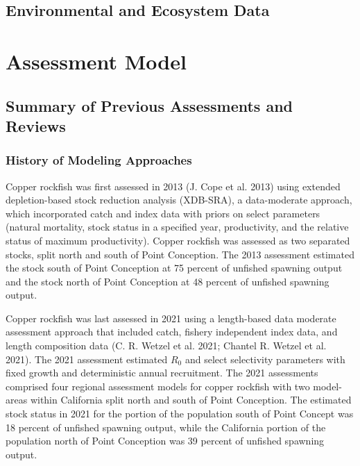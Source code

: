 \documentclass[11pt,
  english,
  letterpaper,
]{article}
\begin{document}
\hypertarget{environmental-and-ecosystem-data}{%
\subsection{Environmental and Ecosystem Data}\label{environmental-and-ecosystem-data}}

\hypertarget{assessment-model}{%
\section{Assessment Model}\label{assessment-model}}

\hypertarget{summary-of-previous-assessments-and-reviews}{%
\subsection{Summary of Previous Assessments and Reviews}\label{summary-of-previous-assessments-and-reviews}}

\hypertarget{history-of-modeling-approaches}{%
\subsubsection{History of Modeling Approaches}\label{history-of-modeling-approaches}}

Copper rockfish was first assessed in 2013 (J. Cope et al. 2013) using extended depletion-based stock reduction analysis (XDB-SRA), a data-moderate approach, which incorporated catch and index data with priors on select parameters (natural mortality, stock status in a specified year, productivity, and the relative status of maximum productivity). Copper rockfish was assessed as two separated stocks, split north and south of Point Conception. The 2013 assessment estimated the stock south of Point Conception at 75 percent of unfished spawning output and the stock north of Point Conception at 48 percent of unfished spawning output.

Copper rockfish was last assessed in 2021 using a length-based data moderate assessment approach that included catch, fishery independent index data, and length composition data (C. R. Wetzel et al. 2021; Chantel R. Wetzel et al. 2021). The 2021 assessment estimated \(R_0\) and select selectivity parameters with fixed growth and deterministic annual recruitment. The 2021 assessments comprised four regional assessment models for copper rockfish with two model-areas within California split north and south of Point Conception. The estimated stock status in 2021 for the portion of the population south of Point Concept was 18 percent of unfished spawning output, while the California portion of the population north of Point Conception was 39 percent of unfished spawning output.
\end{document}
